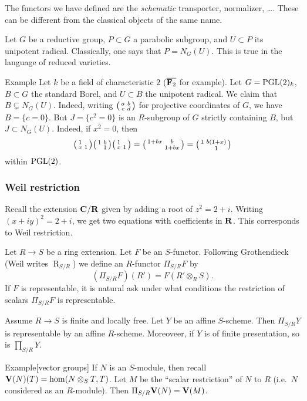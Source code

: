 The functors we have defined are the \emph{schematic} transporter, normalizer, 
\ldots. These can be different from the classical objects of the same name. 

Let $G$ be a reductive group, $P\subset G$ a parabolic subgroup, and 
$U\subset P$ its unipotent radical. Classically, one says that 
$P=N_G(U)$. This is true in the language of reduced varieties. 

\begin{enonce}[remark]{Example}
Let $k$ be a field of characteristic $2$ ($\overline{\mathbf{F}_2}$ for example). 
Let $G=\operatorname{PGL}(2)_k$, $B\subset G$ the standard Borel, and 
$U\subset B$ the unipotent radical. We claim that 
$B\subsetneq N_G(U)$. Indeed, writing $\bigl(\begin{smallmatrix} a & b \\ c & d \end{smallmatrix} \bigr)$ for projective 
coordinates of $G$, we have $B=\{c=0\}$. But $J=\{c^2=0\}$ is an 
$R$-subgroup of $G$ strictly containing $B$, but $J\subset N_G(U)$. Indeed, 
if $x^2=0$, then 
\[
  \bigl(\begin{smallmatrix} 1 &  \\ x & 1 \end{smallmatrix} \bigr) \bigl(\begin{smallmatrix} 1 & b \\  & 1 \end{smallmatrix} \bigr) \bigl(\begin{smallmatrix} 1 &  \\ x & 1 \end{smallmatrix} \bigr) = \bigl(\begin{smallmatrix} 1+b x & b \\  & 1+b x \end{smallmatrix} \bigr) = \bigl(\begin{smallmatrix} 1 & b(1+x) \\  & 1 \end{smallmatrix} \bigr) 
\]
within $\operatorname{PGL}(2)$. 
\end{enonce}


\subsubsection{Weil restriction}

Recall the extension $\mathbf{C}/\mathbf{R}$ given by adding a root of $z^2=2+i$. 
Writing $(x+i y)^2 = 2+i$, we get two equations with coefficients in $\mathbf{R}$. 
This corresponds to Weil restriction. 

Let $R\to S$ be a ring extension. Let $F$ be an $S$-functor. Following 
Grothendieck (Weil writes $\operatorname{R}_{S/R}$) we define an $R$-functor 
$\Pi_{S/R} F$ by 
\[
  (\Pi_{S/R} F)(R') = F(R'\otimes_R S) .
\]
If $F$ is representable, it is natural ask under what conditions the 
restriction of scalars $\Pi_{S/R} F$ is representable. 

\begin{theo}
Assume $R\to S$ is finite and locally free. Let $Y$ be an affine $S$-scheme. 
Then $\Pi_{S/R} Y$ is representable by an affine $R$-scheme. Moreoveer, if 
$Y$ is of finite presentation, so is $\prod_{S/R} Y$. 
\end{theo}

\begin{enonce}[remark]{Example}[vector groups]
If $N$ is an $S$-module, then recall $\mathbf{V}(N)(T) = \hom(N\otimes_S T,T)$. Let 
$M$ be the ``scalar restriction'' of $N$ to $R$ (i.e.\ $N$ considered as an 
$R$-module). Then $\Pi_{S/R} \mathbf{V}(N) = \mathbf{V}(M)$. 
\end{enonce}

